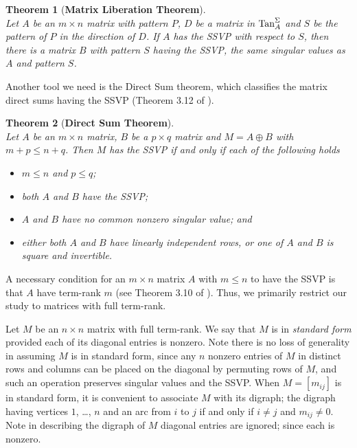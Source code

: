 \documentclass[preprint,12pt]{elsarticle}
\newtheorem{theorem}{Theorem}[section]
\begin{document}
\begin{theorem}[\bf Matrix Liberation Theorem]
\phantom{ } \\
Let $A$ be an $m\times n$ matrix with pattern $P$,  $D$ be a matrix in $\mbox{\rm Tan}^{\Sigma}_A$ 
and  $S$ be the pattern of $P$ in the direction of $D$.
If $A$ has the SSVP with respect to $S$, then there is a matrix $B$ with pattern 
$S$ having the SSVP, the  same singular values as $A$ and pattern $S$.

\end{theorem}


Another tool we need is the Direct Sum theorem, which classifies the matrix direct sums having the SSVP (Theorem 3.12 of 
\cite{cheung2025strongsingularvalueproperty}).

\begin{theorem}[\bf Direct Sum Theorem]
\label{dsum}
\phantom{ }\\
Let $A$ be an $m\times n$ matrix, $B$ be a $p \times q$ matrix and $M=A\oplus B$ with $m+p \leq n+q$.
Then $M$ has the SSVP if and only if  each of the following holds
\begin{itemize}
\item[\rm (a)] 
$ m \leq n$ and $p\leq q$;
\item[\rm (b)] 
both $A$ and $B$ have the SSVP; 
\item[\rm (c)] $A$ and $B$ have no common nonzero singular value; and
\item[\rm (d)] either both $A$ and $B$
have linearly independent rows, or one of $A$ and $B$ is square and invertible.
\end{itemize}
\end{theorem}


A necessary condition for an $m\times n$ matrix $A$ with $m\leq n$ to have the SSVP is that $A$ have term-rank $m$ (see Theorem 3.10 of \cite{cheung2025strongsingularvalueproperty}).  Thus, we primarily  restrict our study to matrices with full term-rank.

Let $M$ be an $n\times n$ matrix with full term-rank. We say that $M$ is in {\it standard form} provided each of its diagonal entries is nonzero. Note there is no loss of generality 
in assuming $M$ is in standard form, since 
any $n$ nonzero entries of $M$ in distinct rows and columns can be placed on the diagonal by permuting rows of $M$, 
and such an operation preserves singular values and the SSVP. When $M=[m_{ij}]$ is in standard form, it is convenient to associate $M$ with 
its digraph; the  digraph having vertices $1$, \ldots, $n$ and an arc from $i$ to $j$ 
if and only if $i\neq j$ and $m_{ij}\neq 0$.
Note in describing the digraph of $M$ 
diagonal entries are ignored; since each is nonzero.
\end{document}
